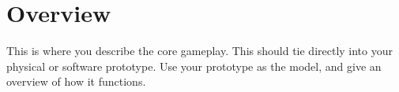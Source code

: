 \section{Overview} %
This is where you describe the core gameplay. This should tie directly into
your physical or software prototype. Use your prototype as the model, and give
an overview of how it functions.